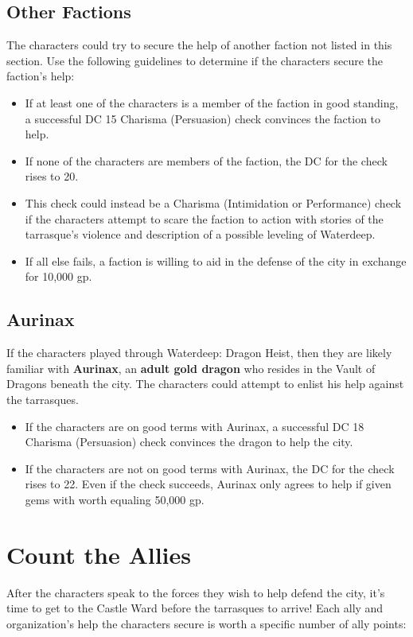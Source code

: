 \documentclass[10pt,a4paper,twoside,bg=print,twocolumn,openany,nodeprecatedcode]{dndbook}
\begin{document}
\subsection{Other Factions}
The characters could try to secure the help of another faction not listed in this section. Use the following guidelines to determine if the characters secure the faction's help:


\begin{itemize}
\item If at least one of the characters is a member of the faction in good standing, a successful DC 15 Charisma (Persuasion) check convinces the faction to help.
\item If none of the characters are members of the faction, the DC for the check rises to 20.
\item This check could instead be a Charisma (Intimidation or Performance) check if the characters attempt to scare the faction to action with stories of the tarrasque's violence and description of a possible leveling of Waterdeep.
\item If all else fails, a faction is willing to aid in the defense of the city in exchange for 10,000 gp.
\end{itemize}

\subsection{\textbf{Aurinax}}
If the characters played through Waterdeep: Dragon Heist, then they are likely familiar with \textbf{Aurinax}, an \textbf{adult gold dragon} who resides in the Vault of Dragons beneath the city. The characters could attempt to enlist his help against the tarrasques.


\begin{itemize}
\item If the characters are on good terms with Aurinax, a successful DC 18 Charisma (Persuasion) check convinces the dragon to help the city.
\item If the characters are not on good terms with Aurinax, the DC for the check rises to 22. Even if the check succeeds, Aurinax only agrees to help if given gems with worth equaling 50,000 gp.
\end{itemize}

\section{Count the Allies}
After the characters speak to the forces they wish to help defend the city, it's time to get to the Castle Ward before the tarrasques to arrive! Each ally and organization's help the characters secure is worth a specific number of ally points:
\end{document}
